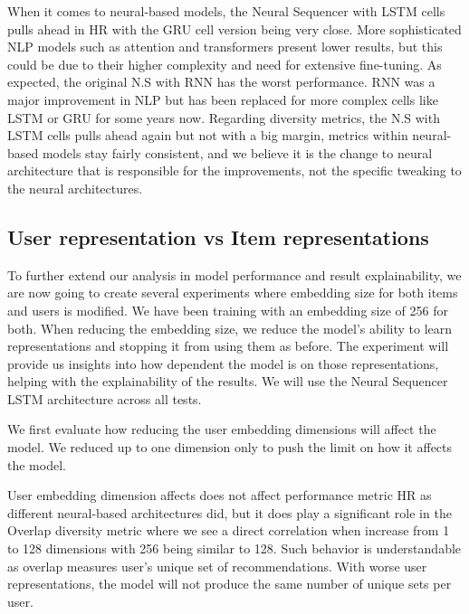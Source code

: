 \documentclass{kththesis}
\begin{document}
When it comes to neural-based models, the Neural Sequencer with LSTM cells pulls ahead in HR with the GRU cell version being very close. More sophisticated NLP models such as attention and transformers present lower results, but this could be due to their higher complexity and need for extensive fine-tuning. As expected, the original N.S with RNN has the worst performance. RNN was a major improvement in NLP but has been replaced for more complex cells like LSTM or GRU for some years now. Regarding diversity metrics, the N.S with LSTM cells pulls ahead again but not with a big margin, metrics within neural-based models stay fairly consistent, and we believe it is the change to neural architecture that is responsible for the improvements, not the specific tweaking to the neural architectures. 

\subsection{User representation vs Item representations}
To further extend our analysis in model performance and result explainability, we are now going to create several experiments where embedding size for both items and users is modified. We have been training with an embedding size of 256 for both. When reducing the embedding size, we reduce the model's ability to learn representations and stopping it from using them as before. The experiment will provide us insights into how dependent the model is on those representations, helping with the explainability of the results. We will use the Neural Sequencer LSTM architecture across all tests.

We first evaluate how reducing the user embedding dimensions will affect the model. We reduced up to one dimension only to push the limit on how it affects the model. 

\begin{center}

\end{center}

User embedding dimension affects does not affect performance metric HR as different neural-based architectures did, but it does play a significant role in the Overlap diversity metric where we see a direct correlation when increase from 1 to 128 dimensions with 256 being similar to 128. Such behavior is understandable as overlap measures user's unique set of recommendations. With worse user representations, the model will not produce the same number of unique sets per user.
\end{document}
